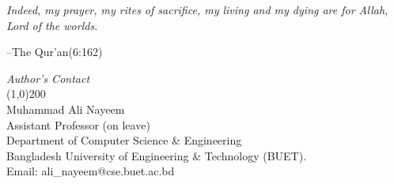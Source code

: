  \vspace{40cm}
 	 \textit{\Large Indeed, my prayer, my rites of sacrifice, my living and my dying are for Allah, Lord of the worlds.}  \begin{flushright}\Large --The Qur'an(6:162)\\\end{flushright}
 \vspace{11cm}
 \begin{flushright}
 \textit{\Large \sc Author's Contact}\\
 \line(1,0){200}\\
 Muhammad Ali Nayeem\\
 Assistant Professor (on leave)\\
 Department of Computer Science \& Engineering \\
 Bangladesh University of Engineering \& Technology (BUET).\\
 Email:
 {ali\_nayeem@cse.buet.ac.bd}
 \end{flushright}
 \newpage
 \vspace*{-3.7cm}
